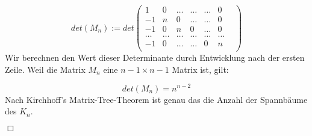 \begin{equation}
det(M_n):=det
\begin{pmatrix}
1&0&\ldots&\ldots&\ldots&0\\
-1&n&0&\ldots&\ldots&0\\
-1&0&n&0&\ldots&0\\
\ldots&\ldots&\ldots&\ldots&\ldots&\ldots&\\
-1&0&\ldots&\ldots&0&n\\
\end{pmatrix}
\end{equation}
Wir berechnen den Wert dieser Determinante durch Entwicklung nach der ersten Zeile. Weil die Matrix $M_n$ eine $n-1 \times n-1$ Matrix ist, gilt:

\begin{equation}
 det(M_n)=n^{n-2}
\end{equation}
Nach Kirchhoff's Matrix-Tree-Theorem ist genau das die Anzahl der Spannbäume des $K_n$.
\begin{flushright} $\Box$ \end{flushright} 

